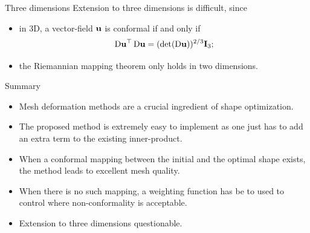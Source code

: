 \documentclass[aspectratio=1610]{beamer}
\newcommand{\includemovie}[2][]{
    \includemedia[
    #1,
    activate=pageopen,transparent,
    addresource=#2.mp4,addresource=#2.png,
    flashvars={
        file=#2.mp4&image=#2.png&
        stretching=uniform&start=0&
        screencolor=white& %
        controlbar.position=over&controlbar.idlehide=true&
        autostart=true&repeat=always&smoothing=true
    }
    ]{
            \texttt{[image: \#2]}
    }{player.swf}
}
\begin{document}
\begin{frame}[b]
    \begin{adjustwidth}{-6em}{-6em}
        \begin{figure}
            \begin{center}
                \includemovie[width=0.99\paperwidth]{./img/navierstokes-channel}
            \end{center}
        \end{figure}
    \end{adjustwidth}
\end{frame}
\begin{frame}{Three dimensions}
    Extension to three dimensions is difficult\pause, since
    \begin{itemize}
        \item in 3D, a vector-field $\mathbf{u}$ is conformal if and only if 
            \begin{equation}
                \operatorname{D}\!{\mathbf{u}}^\top\operatorname{D}\!{\mathbf{u}} = (\mathrm{det}(\operatorname{D}\!{\mathbf{u}}))^{2/3} \mathbf{I}_3;
            \end{equation}\pause
        \item the Riemannian mapping theorem only holds in two dimensions.
    \end{itemize}
\end{frame}
\begin{frame}{Summary}
    \begin{itemize}
        \item<1->Mesh deformation methods are a crucial ingredient of shape optimization.
        \item<2->The proposed method is extremely easy to implement as one just has to add an extra term to the existing inner-product.
        \item<3-> When a conformal mapping between the initial and the optimal shape exists, the method leads to excellent mesh quality.
        \item<4-> When there is no such mapping, a weighting function has be to used to control where non-conformality is acceptable.
        \item<5-> Extension to three dimensions questionable.
    \end{itemize}
\end{frame}
\end{document}

